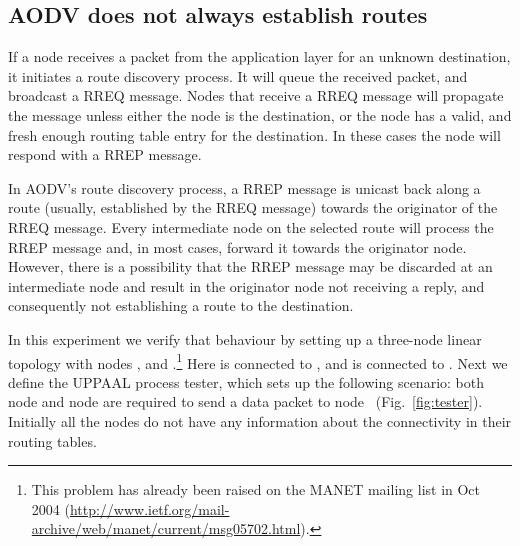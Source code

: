 \documentclass[conference,twoside]{IEEEtran}
\newcommand{\tester}{{\small\sf tester}\xspace}
\begin{document}
\subsection{AODV does not always establish routes}\label{subsec:non-optimal-route}

If a node receives a packet from the application layer for an
unknown destination, it initiates a route discovery process. It will
queue the received packet, and broadcast a RREQ message. Nodes that
receive a RREQ message will propagate the message unless either the
node is the destination, or the node has a valid, and fresh enough
routing table entry for the destination. In these cases the node will respond with a RREP message.



In AODV's route discovery process, a RREP message
is unicast back
along a route (usually, established by the RREQ message) towards the
originator of the RREQ message. Every intermediate node on the
selected route will process the RREP message and, in most cases,
forward it towards the originator node. However, there is a
possibility that the RREP message may be discarded at an intermediate
node and result in the originator node not receiving a
reply, and consequently not establishing a route to the destination.

In this experiment we verify that behaviour by setting up a three-node linear topology with nodes ,  and .\footnote{
This problem has already been raised on the MANET mailing list in Oct
2004 (\url{http://www.ietf.org/mail-archive/web/manet/current/msg05702.html}).}
Here  is connected to , and  is connected to .
Next we define the UPPAAL process {\tester}, which sets up the following scenario:
 both node  and node  are required to send a data packet to node~ (Fig.~\ref{fig:tester}). Initially all the nodes do not have any information about the connectivity in their routing tables.
\end{document}
